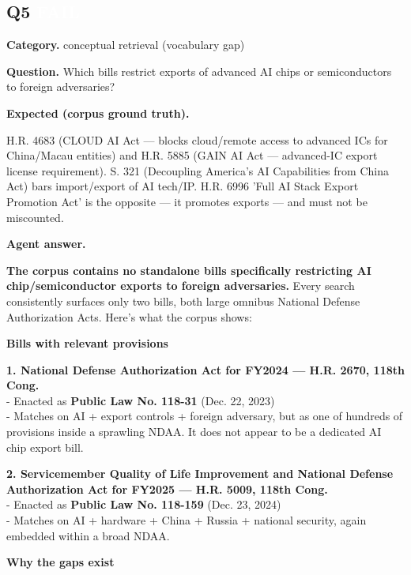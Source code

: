\documentclass[11pt]{article}
\newcommand{\fieldlabel}[1]{\textbf{\color{navy}#1}\quad}
\begin{document}
\subsection*{Q5 \quad \colorbox{failred}{\textcolor{white}{\bfseries FAIL}}}
\fieldlabel{Category.} conceptual retrieval (vocabulary gap)\par
\fieldlabel{Question.} Which bills restrict exports of advanced AI chips or semiconductors to foreign adversaries?\par
\fieldlabel{Expected (corpus ground truth).}\par
H.R. 4683 (CLOUD AI Act --- blocks cloud/remote access to advanced ICs for China/Macau entities) and H.R. 5885 (GAIN AI Act --- advanced-IC export license requirement). S. 321 (Decoupling America's AI Capabilities from China Act) bars import/export of AI tech/IP. H.R. 6996 'Full AI Stack Export Promotion Act' is the opposite --- it promotes exports --- and must not be miscounted.

\fieldlabel{Agent answer.}\par
\textbf{The corpus contains no standalone bills specifically restricting AI chip/semiconductor exports to foreign adversaries.} Every search consistently surfaces only two bills, both large omnibus National Defense Authorization Acts. Here's what the corpus shows:

\textbf{Bills with relevant provisions}

\textbf{1. National Defense Authorization Act for FY2024 --- H.R. 2670, 118th Cong.} \\
- Enacted as \textbf{Public Law No. 118-31} (Dec. 22, 2023) \\
- Matches on AI + export controls + foreign adversary, but as one of hundreds of provisions inside a sprawling NDAA. It does not appear to be a dedicated AI chip export bill.

\textbf{2. Servicemember Quality of Life Improvement and National Defense Authorization Act for FY2025 --- H.R. 5009, 118th Cong.} \\
- Enacted as \textbf{Public Law No. 118-159} (Dec. 23, 2024) \\
- Matches on AI + hardware + China + Russia + national security, again embedded within a broad NDAA.

\textbf{Why the gaps exist}
\end{document}
